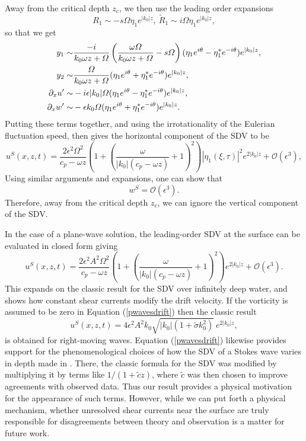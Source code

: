 \documentclass{JFM_Style/jfm}
\newcommand{\pd}{\partial}
\begin{document}
Away from the critical depth $z_{c}$, we then use the leading order expansions
\[
R_{1} \sim -s\Omega\eta_{1}e^{|k_{0}|z}, ~ \tilde{R}_{1} \sim i\Omega\eta_{1}e^{|k_{0}|z}, 
\]
so that we get 
\begin{align*}
y_{1} \sim & \frac{-i}{k_{0}\omega z + \Omega}\left(\frac{\omega\Omega}{k_{0}\omega z + \Omega} - s\Omega \right)(\eta_{1}e^{i\theta} - \eta_{1}^{\ast}e^{-i\theta})e^{|k_{0}|z},\\ 
y_{2} \sim & \frac{\Omega}{k_{0}\omega z + \Omega}(\eta_{1}e^{i\theta} + \eta^{\ast}_{1}e^{-i\theta})e^{|k_{0}|z},\\
\p_{x}u' \sim & -i\epsilon|k_{0}|\Omega(\eta_{1}e^{i\theta}-\eta_{1}^{\ast}e^{-i\theta})e^{|k_{0}|z},\\
\pd_{x}w' \sim & - \epsilon k_{0}\Omega(\eta_{1}e^{i\theta}+\eta_{1}^{\ast}e^{-i\theta})e^{|k_{0}|z}.
\end{align*}
Putting these terms together, and using the irrotationality of the Eulerian fluctuation speed, then gives the horizontal component of the SDV to be 
\begin{equation}
u^{S}(x,z,t) = \frac{2\epsilon^{2}\Omega^{2}}{c_{p} - \omega z }\left(1 + \left(\frac{\omega}{|k_{0}|(c_{p} - \omega z )} + 1\right)^{2} \right)|\eta_{1}(\xi,\tau)|^{2}e^{2|k_{0}|z} + \mathcal{O}(\epsilon^{3}), 
\label{sdriftveloc}
\end{equation}
Using similar arguments and expansions, one can show that 
\[
w^{S} = \mathcal{O}(\epsilon^{3}).
\]
Therefore, away from the critical depth $z_{c}$, we can ignore the vertical component of the SDV.  

In the case of a plane-wave solution, the leading-order SDV at the surface can be evaluated in closed form giving  
\begin{equation}
u^{S}(x,z,t) = \frac{2\epsilon^{2}A^{2}\Omega^{2}}{c_{p}-\omega z} \left(1 + \left(\frac{\omega}{|k_{0}|(c_{p} - \omega z )} + 1\right)^{2} \right) e^{2|k_{0}|z} + \mathcal{O}(\epsilon^{3}).
\label{pwavesdrift}
\end{equation}
This expands on the classic result for the SDV over infinitely deep water, and shows how constant shear currents modify the drift velocity.  If the vorticity is assumed to be zero in Equation (\ref{pwavesdrift}) then the classic result
\begin{equation}
u^{S}(x,z,t) = 4\epsilon^2A^2k_0\sqrt{|k_0|(1+\tilde{\sigma}k_0^2)}~e^{2|k_0|z},
\end{equation}
is obtained for right-moving waves.  Equation (\ref{pwavesdrift}) likewise provides support for the phenomenological choices of how the SDV of a Stokes wave varies in depth made in \cite{breivik}.  There, the classic formula for the SDV was modified by multiplying it by terms like $1/(1+\tilde{c}z)$, where $\tilde{c}$ was then chosen to improve agreements with observed data.  Thus our result provides a physical motivation for the appearance of such terms.  However, while we can put forth a physical mechanism, whether unresolved shear currents near the surface are truly responsible for disagreements between theory and observation is a matter for future work.     
\end{document}
